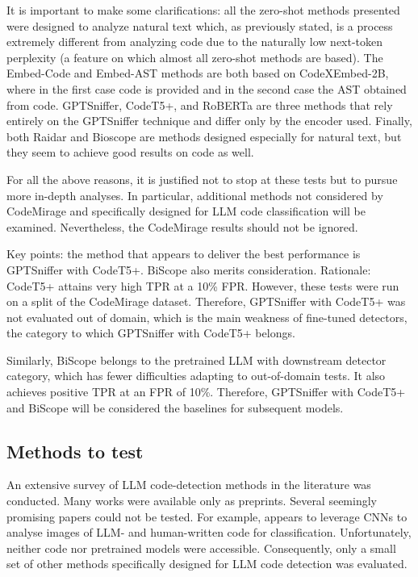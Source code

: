 It is important to make some clarifications: all the zero-shot 
methods presented were designed to analyze natural text which, 
as previously stated, is a process extremely different from 
analyzing code due to the naturally low next-token perplexity 
(a feature on which almost all zero-shot methods are based). 
The Embed-Code and Embed-AST methods are both based on 
CodeXEmbed-2B\cite{liu2024codexembed}, where in the first case code is provided and 
in the second case the AST obtained from code. GPTSniffer, 
CodeT5+, and RoBERTa are three methods that rely entirely on 
the GPTSniffer\cite{nguyen2024gptsniffer} technique and differ only by the encoder used. 
Finally, both Raidar and Bioscope are methods designed especially 
for natural text, but they seem to achieve good results on code as well.

For all the above reasons, it is justified not to stop at these tests but to pursue more in-depth analyses. In particular, additional methods not considered by CodeMirage and specifically designed for LLM code classification will be examined. Nevertheless, the CodeMirage results should not be ignored.

Key points: the method that appears to deliver the best performance 
is GPTSniffer with CodeT5+. BiScope also merits consideration. 
Rationale: CodeT5+ attains very high TPR at a 10\% 
FPR. However, these tests were run on a split of the 
CodeMirage dataset. Therefore, GPTSniffer with CodeT5+ 
was not evaluated out of domain, which is the main weakness 
of fine-tuned detectors, the category to which GPTSniffer with 
CodeT5+ belongs.

Similarly, BiScope belongs to the pretrained LLM with 
downstream detector category, which has fewer difficulties 
adapting to out-of-domain tests. It also achieves positive 
TPR at an FPR of 10\%. Therefore, GPTSniffer with 
CodeT5+ and BiScope will be considered the baselines 
for subsequent models.




\subsection{Methods to test}
An extensive survey of LLM code-detection methods 
in the literature was conducted. Many works were available 
only as preprints. Several seemingly promising papers could 
not be tested. For example, \cite{xu2025codevision} appears 
to leverage CNNs to analyse images of LLM- and human-written 
code for classification. Unfortunately, neither code nor 
pretrained models were accessible. Consequently, only a small 
set of other methods specifically designed for LLM code detection 
was evaluated.








